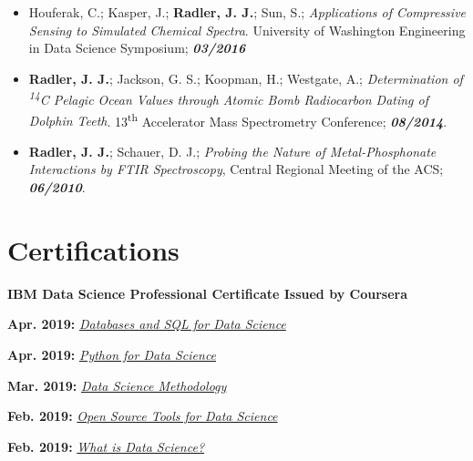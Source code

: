 \documentclass[letterpaper]{deedy-resume} %
\begin{document}
\begin{minipage}[t]{0.65\textwidth}
\begin{itemize}
\item Houferak, C.; Kasper, J.; \textbf{Radler, J. J.}; Sun, S.; \emph{Applications of Compressive Sensing to Simulated Chemical Spectra}. University of Washington Engineering in Data Science Symposium;	\textbf{\textit{03/2016}}

\item \textbf{Radler, J. J.}; Jackson, G. S.; Koopman, H.; Westgate, A.; \emph{Determination of \textsuperscript{14}C Pelagic Ocean Values through Atomic Bomb Radiocarbon Dating of Dolphin Teeth}. 13\textsuperscript{th} Accelerator Mass Spectrometry Conference;	\textbf{\textit{08/2014}}.

\item \textbf{Radler, J. J.}; Schauer, D. J.; \emph{Probing the Nature of Metal-Phosphonate Interactions by FTIR Spectroscopy}, Central Regional Meeting of the ACS;	\textbf{\textit{06/2010}}.
\end{itemize}


\section{Certifications}
\textbf{IBM Data Science Professional Certificate Issued by Coursera}
\begin{tightitemize}
\item \textbf{Apr. 2019:} \href{https://www.coursera.org/account/accomplishments/certificate/WWSD2GBMB8EX}{\textit{Databases and SQL for Data Science}}
\item \textbf{Apr. 2019:} \href{https://www.coursera.org/account/accomplishments/certificate/W4EADFQY28ZJ}{\textit{Python for Data Science}}
\item \textbf{Mar. 2019:} \href{https://www.coursera.org/account/accomplishments/certificate/5BM3VZET3N9E}{\textit{Data Science Methodology}}
\item \textbf{Feb. 2019:} \href{https://www.coursera.org/account/accomplishments/certificate/A2LTPE84WG4H}{\textit{Open Source Tools for Data Science}}
\item \textbf{Feb. 2019:} \href{https://www.coursera.org/account/accomplishments/certificate/MLKNRE5BPR9X}{\textit{What is Data Science?}}
\end{tightitemize}

\end{minipage}
\end{document}
